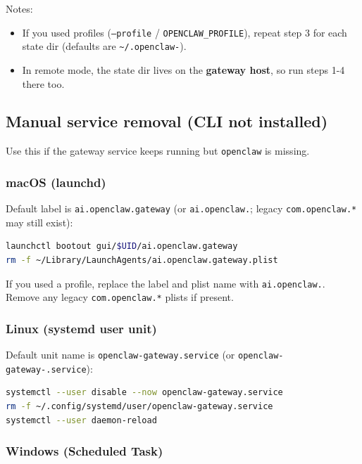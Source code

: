 Notes:

\begin{itemize}
  \item If you used profiles (\texttt{--profile} / \texttt{OPENCLAW\_PROFILE}), repeat step 3 for each state dir (defaults are \texttt{\textasciitilde{}/.openclaw-}).
  \item In remote mode, the state dir lives on the \textbf{gateway host}, so run steps 1-4 there too.
\end{itemize}


\subsection{Manual service removal (CLI not installed)}


Use this if the gateway service keeps running but \texttt{openclaw} is missing.

\subsubsection{macOS (launchd)}


Default label is \texttt{ai.openclaw.gateway} (or \texttt{ai.openclaw.}; legacy \texttt{com.openclaw.*} may still exist):

\begin{lstlisting}[language=bash]
launchctl bootout gui/$UID/ai.openclaw.gateway
rm -f ~/Library/LaunchAgents/ai.openclaw.gateway.plist
\end{lstlisting}


If you used a profile, replace the label and plist name with \texttt{ai.openclaw.}. Remove any legacy \texttt{com.openclaw.*} plists if present.

\subsubsection{Linux (systemd user unit)}


Default unit name is \texttt{openclaw-gateway.service} (or \texttt{openclaw-gateway-.service}):

\begin{lstlisting}[language=bash]
systemctl --user disable --now openclaw-gateway.service
rm -f ~/.config/systemd/user/openclaw-gateway.service
systemctl --user daemon-reload
\end{lstlisting}


\subsubsection{Windows (Scheduled Task)}



